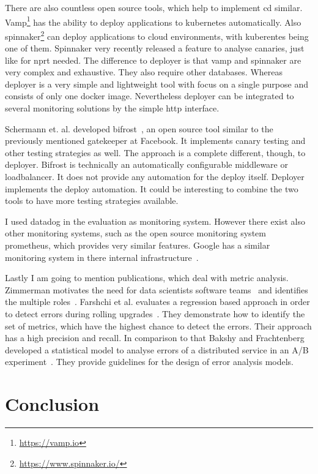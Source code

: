 There are also countless open source tools, which help to implement \gls{cd}
similar. Vamp\footnote{\url{https://vamp.io}} has the ability to deploy applications to
kubernetes automatically. Also spinnaker\footnote{\url{https://www.spinnaker.io/}} can
deploy applications to cloud environments, with kuberentes being one of them. Spinnaker
very recently released a feature to analyse canaries, just like for \gls{nprt} needed. The
difference to deployer is that vamp and spinnaker are very complex and exhaustive. They
also require other databases. Whereas deployer is a very simple and lightweight tool with
focus on a single purpose and consists of only one docker image. Nevertheless deployer can
be integrated to several monitoring solutions by the simple http interface.

Schermann et. al. developed bifrost~\cite{bifrost}, an open source tool similar to the
previously mentioned gatekeeper at Facebook. It implements canary testing and other
testing strategies as well. The approach is a complete different, though, to
deployer. Bifrost is technically an automatically configurable middleware or
loadbalancer. It does not provide any automation for the deploy itself. Deployer
implements the deploy automation. It could be interesting to combine the two tools to have
more testing strategies available.

I used datadog in the evaluation as monitoring system. However there exist also other
monitoring systems, such as the open source monitoring system prometheus, which provides
very similar features. Google has a similar monitoring system in there internal
infrastructure~\cite{sre_monitoring}.

Lastly I am going to mention publications, which deal with metric analysis. Zimmerman
motivates the need for data scientists software teams~\cite{data_science_role2} and
identifies the multiple roles~\cite{data_science_role}. Farshchi et al. evaluates a
regression based approach in order to detect errors during rolling
upgrades~\cite{anomaly_detection}. They demonstrate how to identify the set of metrics,
which have the highest chance to detect the errors. Their approach has a high precision
and recall. In comparison to that Bakshy and Frachtenberg developed a statistical model to
analyse errors of a distributed service in an A/B
experiment~\cite{error_analysis_of_distr_system}. They provide guidelines for the design
of error analysis models.

\chapter{Conclusion}
\label{chap:conclusion}


